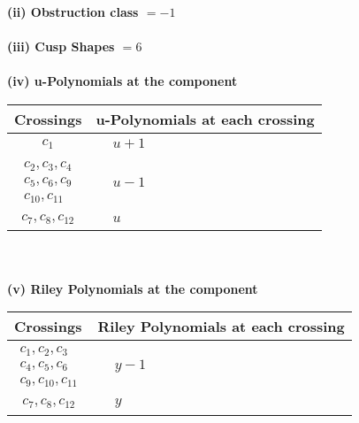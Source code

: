 \documentclass[1p]{elsarticle_modified}
\theoremstyle{definition}
\begin{document}
\flushleft \textbf{(ii) Obstruction class $= -1$}\\~\\
\flushleft \textbf{(iii) Cusp Shapes $= 6$}\\~\\
\newpage\renewcommand{\arraystretch}{1}
\flushleft \textbf{(iv) u-Polynomials at the component}\newline \\
\begin{tabular}{m{50pt}|m{274pt}}
Crossings & \hspace{64pt}u-Polynomials at each crossing \\
\hline $$\begin{aligned}c_{1}\end{aligned}$$&$\begin{aligned}
&u+1
\end{aligned}$\\
\hline $$\begin{aligned}c_{2},c_{3},c_{4}\\c_{5},c_{6},c_{9}\\c_{10},c_{11}\end{aligned}$$&$\begin{aligned}
&u-1
\end{aligned}$\\
\hline $$\begin{aligned}c_{7},c_{8},c_{12}\end{aligned}$$&$\begin{aligned}
&u
\end{aligned}$\\
\hline
\end{tabular}\\~\\
\newpage\renewcommand{\arraystretch}{1}
\flushleft \textbf{(v) Riley Polynomials at the component}\newline \\
\begin{tabular}{m{50pt}|m{274pt}}
Crossings & \hspace{64pt}Riley Polynomials at each crossing \\
\hline $$\begin{aligned}c_{1},c_{2},c_{3}\\c_{4},c_{5},c_{6}\\c_{9},c_{10},c_{11}\end{aligned}$$&$\begin{aligned}
&y-1
\end{aligned}$\\
\hline $$\begin{aligned}c_{7},c_{8},c_{12}\end{aligned}$$&$\begin{aligned}
&y
\end{aligned}$\\
\hline
\end{tabular}\\~\\
\end{document}
